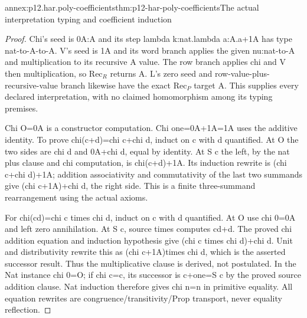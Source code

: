 \begin{annexitem}{annex:p12.har.poly-coefficients}{thm:p12-har-poly-coefficients}{The actual interpretation typing and coefficient induction}
\begin{proof}
Chi's seed is 0A:A and its step lambda k:nat.lambda a:A.a+1A
has type nat-to-A-to-A. V's seed is 1A and its word branch applies
the given nu:nat-to-A and multiplication to its recursive A value.
The row branch applies chi and V then multiplication, so \(\mathrm{Rec}_R\)
returns A. L's zero seed and row-value-plus-recursive-value branch
likewise have the exact \(\mathrm{Rec}_P\) target A. This supplies every declared
interpretation, with no claimed homomorphism among its typing premises.

Chi O=0A is a constructor computation. Chi one=0A+1A=1A uses the
additive identity. To prove chi(c+d)=chi c+chi d, induct on c
with d quantified. At O the two sides are chi d and 0A+chi d,
equal by identity. At S c the left, by the nat plus clause and
chi computation, is chi(c+d)+1A. Its induction rewrite is
(chi c+chi d)+1A; addition associativity and commutativity of the
last two summands give (chi c+1A)+chi d, the right side.
This is a finite three-summand rearrangement using the actual axioms.

For chi(cd)=chi c times chi d, induct on c with d quantified.
At O use chi 0=0A and left zero annihilation. At S c, source times
computes cd+d. The proved chi addition equation and induction
hypothesis give (chi c times chi d)+chi d. Unit and distributivity
rewrite this as (chi c+1A)times chi d, which is the asserted
successor result. Thus the multiplicative clause is derived, not
postulated. In the Nat instance chi 0=O; if chi c=c, its successor
is c+one=S c by the proved source addition clause. Nat induction
therefore gives chi n=n in primitive equality. All equation rewrites
are congruence/transitivity/Prop transport, never equality reflection.
\end{proof}
\end{annexitem}

